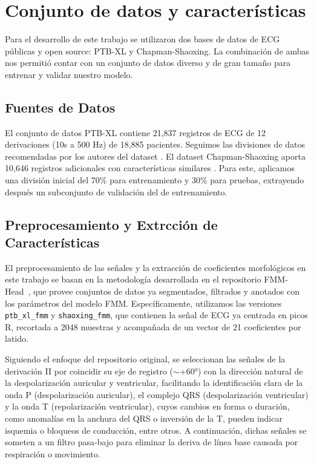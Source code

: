 \documentclass[11pt]{article}
\begin{document}
\section{Conjunto de datos y características}
Para el desarrollo de este trabajo se utilizaron dos bases de datos de ECG públicas y open source: PTB-XL y Chapman-Shaoxing. La combinación de ambas nos permitió contar con un conjunto de datos diverso y de gran tamaño para entrenar y validar nuestro modelo.

\subsection{Fuentes de Datos}
El conjunto de datos PTB-XL contiene 21,837 registros de ECG de 12 derivaciones (10s a 500 Hz) de 18,885 pacientes. Seguimos las divisiones de datos recomendadas por los autores del dataset \cite{wagner2020ptb}. El dataset Chapman-Shaoxing aporta 10,646 registros adicionales con características similares \cite{zheng2020chapman}. Para este, aplicamos una división inicial del 70\% para entrenamiento y 30\% para pruebas, extrayendo después un subconjunto de validación del de entrenamiento.

\subsection{Preprocesamiento y Extrcción de Características} \label{sec: Preprocesamiento}

El preprocesamiento de las señales y la extracción de coeficientes morfológicos en este trabajo se basan en la metodología desarrollada en el repositorio FMM-Head~\cite{verardo2023fmmhead}, que provee conjuntos de datos ya segmentados, filtrados y anotados con los parámetros del modelo FMM. Específicamente, utilizamos las versiones \texttt{ptb\_xl\_fmm} y \texttt{shaoxing\_fmm}, que contienen la señal de ECG ya centrada en picos R, recortada a 2048 muestras y acompañada de un vector de 21 coeficientes por latido. 

Siguiendo el enfoque del repositorio original, se seleccionan las señales de la derivación II por coincidir su eje de registro ($\sim$+60°) con la dirección natural de la despolarización auricular y ventricular, facilitando la identificación clara de la onda P (despolarización auricular), el complejo QRS (despolarización ventricular) y la onda T (repolarización ventricular), cuyos cambios en forma o duración, como anomalías en la anchura del QRS o inversión de la T, pueden indicar isquemia o bloqueos de conducción, entre otros. A continuación, dichas señales se someten a un filtro pasa‑bajo para eliminar la deriva de línea base causada por respiración o movimiento.
\end{document}
